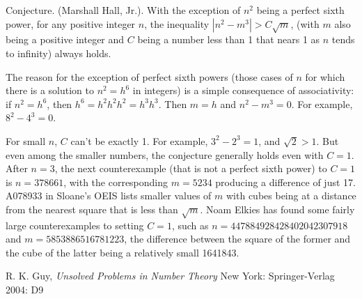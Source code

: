 \documentclass[12pt]{article}
\begin{document}
Conjecture. (Marshall Hall, Jr.). With the exception of $n^2$ being a perfect sixth power, for any positive integer $n$, the inequality $|n^2 - m^3| > C \sqrt{m}$, (with $m$ also being a positive integer and $C$ being a number less than 1 that nears 1 as $n$ tends to infinity) always holds.

The reason for the exception of perfect sixth powers (those cases of $n$ for which there is a solution to $n^2 = h^6$ in integers) is a simple consequence of associativity: if $n^2 = h^6$, then $h^6 = h^2 h^2 h^2 = h^3 h^3$. Then $m = h$ and $n^2 - m^3 = 0$. For example, $8^2 - 4^3 = 0$.

For small $n$, $C$ can't be exactly 1. For example, $3^2 - 2^3 = 1$, and $\sqrt{2} > 1$. But even among the smaller numbers, the conjecture generally holds even with $C = 1$. After $n = 3$, the next counterexample (that is not a perfect sixth power) to $C = 1$ is $n = 378661$, with the corresponding $m = 5234$ producing a difference of just 17. A078933 in Sloane's OEIS lists smaller values of $m$ with cubes being at a distance from the nearest square that is less than $\sqrt{m}$. Noam Elkies has found some fairly large counterexamples to setting $C = 1$, such as $n = 447884928428402042307918$ and $m = 5853886516781223$, the difference between the square of the former and the cube of the latter being a relatively small 1641843. 

\begin{thebibliography}{1}
 R. K. Guy, {\it Unsolved Problems in Number Theory} New York: Springer-Verlag 2004: D9
\end{thebibliography}
\end{document}
